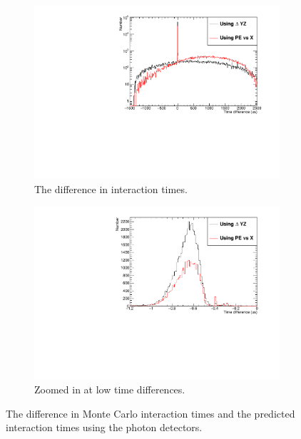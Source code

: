 \begin{figure}[h!]
  \centering
  \begin{subfigure}{0.45\textwidth}
    \centering
    \includegraphics[width=\textwidth]{Pred_Reco_T_Full}
    \caption{The difference in interaction times.}
  \end{subfigure}
  \hspace{0.08\textwidth}
  \begin{subfigure}{0.45\textwidth}
    \centering
    \includegraphics[width=\textwidth]{Pred_Reco_T_Zoom}
    \caption{Zoomed in at low time differences.}
  \end{subfigure}
  \caption[The difference in Monte Carlo interaction times and the predicted interaction times using the photon detectors]
          {The difference in Monte Carlo interaction times and the predicted interaction times using the photon detectors.}
          \label{fig:PD_MCPDDiff}
\end{figure}

